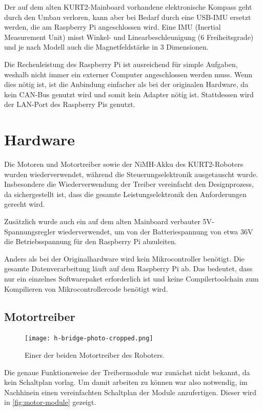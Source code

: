\documentclass[german]{thesis_KBS}
\begin{document}
Der auf dem alten KURT2-Mainboard vorhandene elektronische Kompass geht durch
den Umbau verloren, kann aber bei Bedarf durch eine USB-IMU ersetzt werden, die
am Raspberry Pi angeschlossen wird. Eine IMU (Inertial Measurement Unit) misst
Winkel- und Linearbeschleunigung (6 Freiheitsgrade) und je nach Modell auch die
Magnetfeldstärke in 3 Dimensionen.

Die Rechenleistung des Raspberry Pi ist ausreichend für simple Aufgaben, weshalb
nicht immer ein externer Computer angeschlossen werden muss. Wenn dies nötig
ist, ist die Anbindung einfacher als bei der originalen Hardware, da kein
CAN-Bus genutzt wird und somit kein Adapter nötig ist. Stattdessen wird der
LAN-Port des Raspberry Pis genutzt.


\chapter{Hardware}
\label{ch:hardware}

Die Motoren und Motortreiber sowie der NiMH-Akku des KURT2-Roboters wurden
wiederverwendet, während die Steuerungselektronik ausgetauscht wurde.
Insbesondere die Wiederverwendung der Treiber vereinfacht den Designprozess, da
sichergestellt ist, dass die gesamte Leistungselektronik den Anforderungen
gerecht wird.

Zusätzlich wurde auch ein auf dem alten Mainboard verbauter 5V-Spannungsregler
wiederverwendet, um von der Batteriespannung von etwa 36V die Betriebsspannung
für den Raspberry Pi abzuleiten.

Anders als bei der Originalhardware wird kein Mikrocontroller benötigt. Die
gesamte Datenverarbeitung läuft auf dem Raspberry Pi ab. Das bedeutet, dass nur
ein einzelnes Softwarepaket erforderlich ist und keine Compilertoolchain zum
Kompilieren von Mikrocontrollercode benötigt wird.


\section{Motortreiber}
\label{section:Motortreiber}

\begin{figure}
    \vspace{-11pt}
    \centering \texttt{[image: h-bridge-photo-cropped.png]}
    \caption{Einer der beiden Motortreiber des Roboters.}
    \label{fig:motor-module}
\end{figure}

Die genaue Funktionsweise der Treibermodule war zunächst nicht bekannt, da kein
Schaltplan vorlag. Um damit arbeiten zu können war also notwendig, im Nachhinein
einen vereinfachten Schaltplan der Module anzufertigen. Dieser wird in
\autoref{fig:motor-module} gezeigt.
\end{document}
